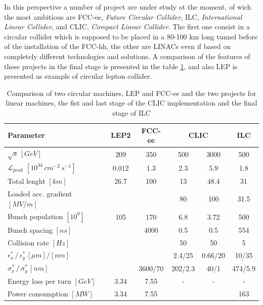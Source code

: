 In this perspective a number of project are under study at the moment, of wich the most ambitious are FCC-ee, \textit{Future Circular Collider}, ILC, \textit{International Linear Collider}, and CLIC, \textit{Compact Linear Collider}. The first one consist in a circular collider which is supposed to be placed in a 80-100 km long tunnel before of the installation of the FCC-hh, the other are LINACs even if based on completely different technologies and solutions.  A comparison of the features of these projects in the final stage is presented in the table \ref{table_CLIC_ILC_FCC}, and also LEP is presented as example of circular lepton collider.

\begin{table}
  \centering
    \begin{tabular}{ l c c | c c c }
    \hline
    \hline
    \textbf{Parameter}								& \textbf{LEP2}	&	\textbf{FCC-ee}	&  \multicolumn{2}{c}{\textbf{CLIC}}	&	\textbf{ILC}	\\
    \hline
    $\sqrt{s} \, [GeV]$				& 209	& 350  		&  	500	&  3000	& 500	\\
    $\mathscr{L}_{peak}$  $[10^{34} \, cm^{-2} \, s^{-1}]$	&0.012	& 1.3			&  	2.3	& 	5.9	&1.8		\\
    Total lenght $[km]$						&26.7	& 100		& 13		&  48.4	& 31		\\
    Loaded acc. gradient $[MV/m]$				&		& 			& 80		& 100 	& 31.5	\\
    Bunch population $[10^9]$					& 105	& 170  		&  6.8	& 	3.72	& 500	\\
    Bunch spacing $[ns]$						& 		& 4000	  	&  	0.5	& 	0.5	& 554	\\
    Collision rate $[Hz]$						&  		&  			&  	50	& 	50	& 5		\\
    $\epsilon^*_x \, / \, \epsilon^*_y \, [\mu m]/[nm]$	& 		&  		        &  2.4/25	& 0.66/20	& 10/35	\\  
    $\sigma^*_x\, / \, \sigma^*_y\, [nm]$			& 		&  	3600/70	&  202/2.3	& 40/1	&474/5.9	\\    
    Energy loss per turn $[GeV]$					&  3.34	& 	7.55		& - 		& -		& -		\\
    Power consumption $[MW]$					&  3.34	& 	7.55		& 		& 		& 163	\\
    \hline
    \hline
    \end{tabular}
  \caption{Comparison of two circular machines, LEP\cite{FCC-ee:leptonCollParam} and FCC-ee\cite{FCC-ee:leptonCollParam,Zimmermann:2057706} and the two projects for linear machines, the fist and last stage of the CLIC implementation \cite{CLIC:cdr} and the final stage of ILC\cite{ILC:tdr} }
\label{table_CLIC_ILC_FCC}
\end{table}



